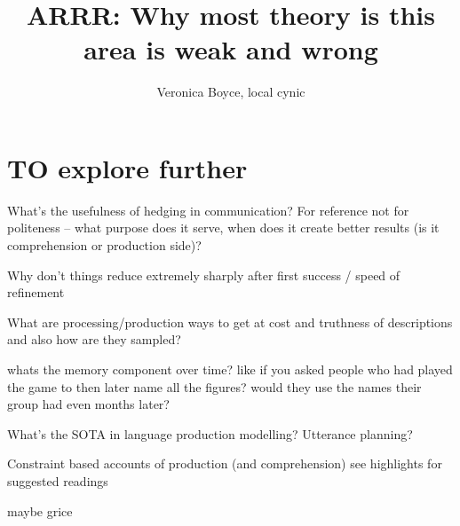 \documentclass[]{article}
\title{ARRR: Why most theory is this area is weak and wrong}
\author{Veronica Boyce, local cynic}
\begin{document}
\maketitle
\section{TO explore further }

What's the usefulness of hedging in communication? For reference not for politeness -- what purpose does it serve, when does it create better results (is it comprehension or production side)? 

Why don't things reduce extremely sharply after first success / speed of refinement

What are processing/production ways to get at cost and truthness of descriptions and also how are they sampled? 

whats the memory component over time? like if you asked people who had played the game to then later name all the figures? would they use the names their group had even months later? 











What's the SOTA in language production modelling? Utterance planning? 

Constraint based accounts of production (and comprehension) see \cite{hanna2003} highlights for suggested readings

maybe grice
\end{document}
